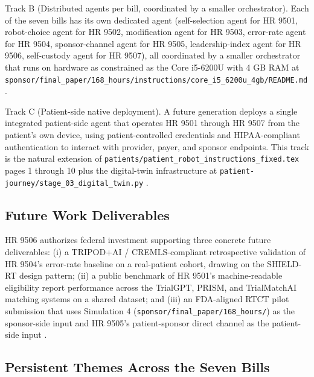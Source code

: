Track B (Distributed agents per bill, coordinated by a smaller
orchestrator). Each of the seven bills has its own dedicated agent
(self-selection agent for HR 9501, robot-choice agent for HR 9502,
modification agent for HR 9503, error-rate agent for HR 9504,
sponsor-channel agent for HR 9505, leadership-index agent for HR
9506, self-custody agent for HR 9507), all coordinated by a
smaller orchestrator that runs on hardware as constrained as the
Core i5-6200U with 4 GB RAM at
\texttt{sponsor/final\_paper/168\_hours/instructions/core\_i5\_6200u\_4gb/README.md}
\cite{kawchak_2026_19396256}.

Track C (Patient-side native deployment). A future generation
deploys a single integrated patient-side agent that operates HR
9501 through HR 9507 from the patient's own device, using
patient-controlled credentials and HIPAA-compliant authentication
to interact with provider, payer, and sponsor endpoints. This
track is the natural extension of
\texttt{patients/patient\_robot\_instructions\_fixed.tex} pages 1
through 10 plus the digital-twin infrastructure at
\texttt{patient-journey/stage\_03\_digital\_twin.py}
\cite{kawchak_2026_18810541, kawchak_2026_19119939}.

\subsection{Future Work Deliverables}

HR 9506 authorizes federal investment supporting three concrete
future deliverables:
(i) a TRIPOD+AI / CREMLS-compliant retrospective validation of HR
9504's error-rate baseline on a real-patient cohort, drawing on the
SHIELD-RT design pattern;
(ii) a public benchmark of HR 9501's machine-readable eligibility
report performance across the TrialGPT, PRISM, and TrialMatchAI
matching systems on a shared dataset; and
(iii) an FDA-aligned RTCT pilot submission that uses Simulation 4
(\texttt{sponsor/final\_paper/168\_hours/}) as the sponsor-side input
and HR 9505's patient-sponsor direct channel as the patient-side
input \cite{fda_rtct_press_2026, kawchak_2026_19994945,
kawchak_2026_19396256, kawchak_2026_19119939}.

\subsection{Persistent Themes Across the Seven Bills}

